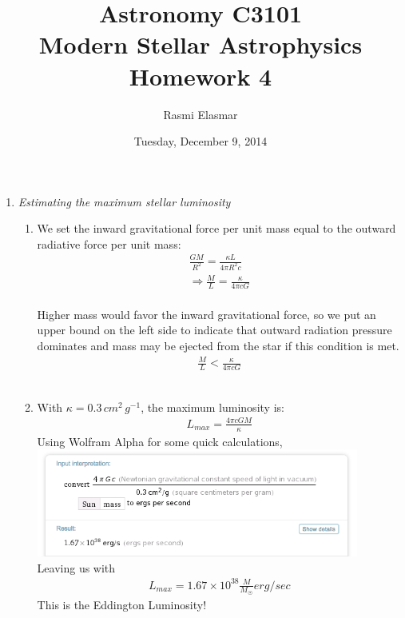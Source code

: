\documentclass[]{article}
\begin{document}
\title{Astronomy C3101 \\ Modern Stellar Astrophysics \\ Homework 4}
\author{Rasmi Elasmar}
\date{Tuesday, December 9, 2014}
\maketitle

\begin{enumerate}
\item{
	\textit{Estimating the maximum stellar luminosity}
	\begin{enumerate}
	\item{
		We set the inward gravitational force per unit mass equal to the outward radiative force per unit mass:
		\begin{gather*}
			\frac{GM}{R^2} = \frac{\kappa L}{4 \pi R^2 c}
			\\
			\Rightarrow \frac{M}{L} = \frac{\kappa }{4 \pi c G}
		\end{gather*}
		\\
		Higher mass would favor the inward gravitational force, so we put an upper bound on the left side to indicate that outward radiation pressure dominates and mass may be ejected from the star if this condition is met.
		\begin{gather*}
			\frac{M}{L} < \frac{\kappa }{4 \pi c G}
		\end{gather*}
	}
	\\
	\item{
		With $\kappa = 0.3\, cm^2 \, g^{-1}$, the maximum luminosity  is:
		\begin{gather*}
			L_{max} = \frac{4 \pi c GM}{\kappa}
		\end{gather*}
		Using Wolfram Alpha for some quick calculations,
		\\
		\includegraphics[width=400px]{eddingtonluminosity}
		\\
		Leaving us with 
		\begin{gather*}
			L_{max} = 1.67 \times 10^{38} \frac{M}{M_{\astrosun}} erg/sec
		\end{gather*}
		This is the Eddington Luminosity!
}
\end{enumerate}}
\end{enumerate}
\end{document}
